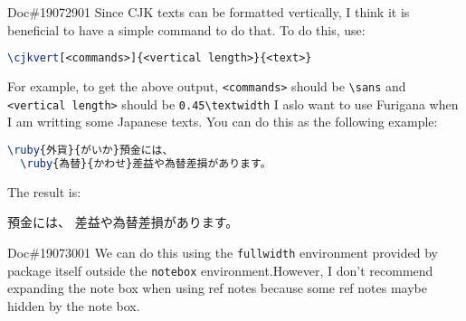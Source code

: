 \documentclass{flownotes}
\begin{document}
\clearpage
{}
\begin{notebox}{Doc\#19072901}
Since CJK texts can be formatted vertically, I think it is beneficial to have a simple command to do that.
To do this, use:
\begin{lstlisting}[language=TeX,
                  basicstyle=\coding,
                  commentstyle=\color{gray}]
\cjkvert[<commands>]{<vertical length>}{<text>}
\end{lstlisting}
For example, to get the above output, \texttt{<commands>} should be \texttt{\textbackslash sans} and \texttt{<vertical length>} should be \texttt{0.45\textbackslash textwidth}
\tcbline
I aslo want to use Furigana when I am writting some Japanese texts. You can do this as the following example:
\begin{lstlisting}[language=TeX,
                  basicstyle=\coding\jp,
                  commentstyle=\color{gray}]
  \ruby{外貨}{がいか}預金には、
  \ruby{為替}{かわせ}差益や為替差損があります。
\end{lstlisting}
The result is:

{\centering\jp {}預金には、
差益や為替差損があります。\par}
\end{notebox}
\begin{fullwidth}
\begin{notebox}{Doc\#19073001}
We can do this using the \texttt{fullwidth} environment provided by  package itself outside the \texttt{notebox} environment.However, I don't recommend expanding the note box when using ref notes because some ref notes maybe hidden by the note box.

\end{notebox}
\end{fullwidth}
\end{document}
